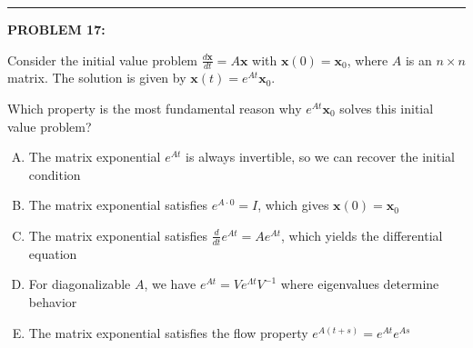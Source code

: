 \documentclass[12pt]{amsart}
\newcommand{\divider}{
  \vspace{-1em} %
  \noindent
  \raisebox{-0.15ex}{\textbullet}%
  \hspace{0.5em}%
  \rule[0.5ex]{0.95\textwidth}{1.0pt}%
  \hspace{0.5em}%
  \raisebox{-0.15ex}{\textbullet}%
  \vspace{0em} %
}
\begin{document}

\divider

{\bf PROBLEM 17:}

Consider the initial value problem $\frac{d\mathbf{x}}{dt} = A\mathbf{x}$ with $\mathbf{x}(0) = \mathbf{x}_0$, where $A$ is an $n \times n$ matrix. The solution is given by $\mathbf{x}(t) = e^{At}\mathbf{x}_0$.

Which property is the most fundamental reason why $e^{At}\mathbf{x}_0$ solves this initial value problem?

\begin{enumerate}[(A)]
\item The matrix exponential $e^{At}$ is always invertible, so we can recover the initial condition
\item The matrix exponential satisfies $e^{A \cdot 0} = I$, which gives $\mathbf{x}(0) = \mathbf{x}_0$
\item The matrix exponential satisfies $\frac{d}{dt}e^{At} = Ae^{At}$, which yields the differential equation
\item For diagonalizable $A$, we have $e^{At} = Ve^{\Lambda t}V^{-1}$ where eigenvalues determine behavior
\item The matrix exponential satisfies the flow property $e^{A(t+s)} = e^{At}e^{As}$
\end{enumerate}
\end{document}
